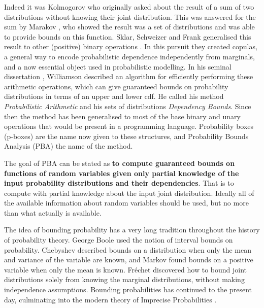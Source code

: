 \documentclass{juliacon}
\begin{document}
\noindent Indeed it was Kolmogorov who originally asked about the result of a sum of two distributions without knowing their joint distribution. This was answered for the sum by Marakov \cite{makarov1982estimates}, who showed the result was a set of distributions and was able to provide bounds on this function. Sklar, Schweizer and Frank generalised this result to other (positive) binary operations \cite{frank1987best,schweizer2011probabilistic}. In this pursuit they created copulas, a general way to encode probabilistic dependence independently from marginals, and a now essential object used in probabilistic modelling. In his seminal dissertation \cite{williamson1989probabilistic}, Williamson described an algorithm for efficiently performing these arithmetic operations, which can give guaranteed bounds on probability distributions in terms of an upper and lower cdf. He called his method \textit{Probabilistic Arithmetic} and his sets of distributions \textit{Dependency Bounds}. Since then the method has been generalised \cite{ferson2015constructing,ferson1996whereof,ferson2004arithmetic} to most of the base binary and unary operations that would be present in a programming language. Probability boxes (p-boxes) are the name now given to these structures, and Probability Bounds Analysis (PBA) the name of the method.

The goal of PBA can be stated as \textbf{to compute guaranteed bounds on functions of random variables given only partial knowledge of the input probability distributions and their dependencies}. That is to compute with partial knowledge about the input joint distribution. Ideally all of the available information about random variables should be used, but no more than what actually is available.

The idea of bounding probability has a very long tradition throughout the history of probability theory. George Boole \cite{boole1854investigation, hailperin1986boole} used the notion of interval bounds on probability. Chebyshev \cite{chebyshev1874valeurs} described bounds on a distribution when only the mean and variance of the variable are known, and Markov \cite{markoff1900question} found bounds on a positive variable when only the mean is known.  Fréchet \cite{frechet1935generalisation} discovered how to bound joint distributions solely from knowing the marginal distributions, without making independence assumptions. Bounding probabilities has continued to the present day, culminating into the modern theory of Imprecise Probabilities \cite{walley1991statistical, klir2013uncertainty, troffaes2014lower, augustin2014introduction}.
\end{document}
